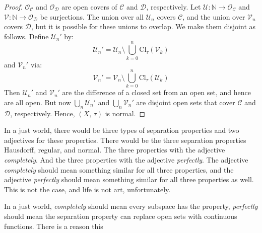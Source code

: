 \documentclass{article}
\theoremstyle{plain}
\theoremstyle{normal}
\begin{document}
\begin{proof}
            $\mathcal{O}_{\mathcal{C}}$ and $\mathcal{O}_{\mathcal{D}}$ are
            open covers of $\mathcal{C}$ and $\mathcal{D}$, respectively.
            Let $\mathcal{U}:\mathbb{N}\rightarrow\mathcal{O}_{\mathcal{C}}$
            and $\mathcal{V}:\mathbb{N}\rightarrow\mathcal{O}_{\mathcal{D}}$ be
            surjections. The union over all $\mathcal{U}_{n}$ covers
            $\mathcal{C}$, and the union over $\mathcal{V}_{n}$ covers
            $\mathcal{D}$, but it is possible for these unions to overlap.
            We make them disjoint as follows.
            Define $\mathcal{U}_{n}'$ by:
            \begin{equation}
                \mathcal{U}_{n}'
                =\mathcal{U}_{n}
                \setminus\bigcup_{k=0}^{n}\textrm{Cl}_{\tau}(\mathcal{V}_{k})
            \end{equation}
            and $\mathcal{V}_{n}'$ via:
            \begin{equation}
                \mathcal{V}_{n}'
                =\mathcal{V}_{n}
                \setminus\bigcup_{k=0}^{n}\textrm{Cl}_{\tau}(\mathcal{U}_{k})
            \end{equation}
            Then $\mathcal{U}_{n}'$ and $\mathcal{V}_{n}'$ are the difference
            of a closed set from an open set, and hence are all open.
            But now $\bigcup_{n}\mathcal{U}_{n}'$ and
            $\bigcup_{n}\mathcal{V}_{n}'$ are disjoint open sets that cover
            $\mathcal{C}$ and $\mathcal{D}$, respectively. Hence,
            $(X,\,\tau)$ is normal.
        \end{proof}
        In a just world, there would be three types of separation properties
        and two adjectives for these properties. There would be the
        three separation properties Hausdorff, regular, and normal.
        The three properties with the adjective \textit{completely}. And the
        three properties with the adjective \textit{perfectly}. The adjective
        \textit{completely} should mean something similar for all three
        properties, and the adjective \textit{perfectly} should mean something
        similar for all three properties as well. This is not the case, and
        life is not art, unfortunately.
        \par\hfill\par
        In a just world, \textit{completely} should mean every subspace has
        the property, \textit{perfectly} should mean the separation property
        can replace open sets with continuous functions. There is a reason this
\end{document}
